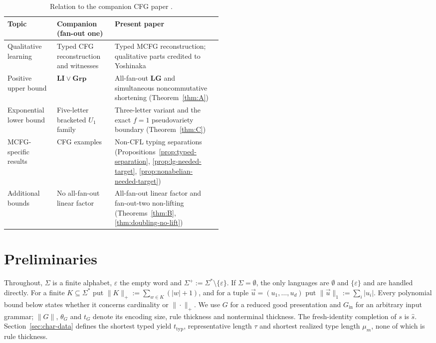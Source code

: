 \documentclass[11pt]{article}
\numberwithin{equation}{section}
\theoremstyle{plain}
\theoremstyle{definition}
\theoremstyle{remark}
\newcommand{\tuple}[1]{\vec{#1}}
\newcommand{\eps}{\varepsilon}
\theoremstyle{plain}
\begin{document}
\begin{table}[htbp]
\caption{Relation to the companion CFG paper \cite{kuriyamaCFG}.}
\label{tab:companion-overlap}
\centering\footnotesize
\setlength{\tabcolsep}{3pt}
\begin{tabularx}{\linewidth}{@{}p{0.23\linewidth}p{0.27\linewidth}X@{}}
\hline
Topic & Companion (fan-out one) & Present paper\\
\hline
Qualitative learning
 & Typed CFG reconstruction and witnesses
 & Typed MCFG reconstruction; qualitative parts credited to Yoshinaka\\
Positive upper bound
 & $\mathbf{LI}\vee\mathbf{Grp}$
 & All-fan-out $\mathbf{LG}$ and simultaneous
   noncommutative shortening (Theorem~\ref{thm:A})\\
Exponential lower bound
 & Five-letter bracketed $U_1$ family
 & Three-letter variant and the exact $f=1$
   pseudovariety boundary (Theorem~\ref{thm:C})\\
MCFG-specific results
 & CFG examples
 & Non-CFL typing separations
   (Propositions~\ref{prop:typed-separation},
   \ref{prop:lg-needed-target}, \ref{prop:nonabelian-needed-target})\\
Additional bounds
 & No all-fan-out linear factor
 & All-fan-out linear factor and fan-out-two non-lifting
   (Theorems~\ref{thm:B}, \ref{thm:doubling-no-lift})\\
\hline
\end{tabularx}
\end{table}

\section{Preliminaries}
\label{sec:prelim}

Throughout, $\Sigma$ is a finite alphabet, $\eps$ the empty word and
$\Sigma^+:=\Sigma^*\setminus\{\eps\}$.  If $\Sigma=\emptyset$, the only
languages are $\emptyset$ and $\{\eps\}$ and are handled directly.  For a
finite $K\subseteq\Sigma^*$ put $\|K\|_+:=\sum_{w\in K}(|w|+1)$, and for a
tuple $\tuple u=(u_1,\ldots,u_d)$ put $\|\tuple u\|_1:=\sum_i|u_i|$.  Every
polynomial bound below states whether it concerns cardinality or
$\|\cdot\|_+$.  We use $G$ for a reduced good presentation and $G_{\mathrm{in}}$ for
an arbitrary input grammar; $\|G\|$, $\theta_G$ and $t_G$ denote
its encoding size, rule thickness and nonterminal thickness.
The fresh-identity completion of $s$ is $\widehat s$.
Section~\ref{sec:char-data} defines the shortest typed yield
$t_{\mathrm{typ}}$, representative length $\tau$ and shortest
realized type length $\mu_m$, none of which is rule thickness.
\end{document}
